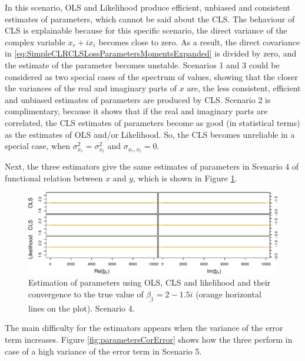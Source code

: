 \documentclass[
]{book}
\begin{document}
In this scenario, OLS and Likelihood produce efficient, unbiased and consistent estimates of parameters, which cannot be said about the CLS. The behaviour of CLS is explainable because for this specific scenario, the direct variance of the complex variable \(x_r + i x_i\) becomes close to zero. As a result, the direct covariance in \eqref{eq:SimpleCLRCLSLossParametersMomentsExpanded} is divided by zero, and the estimate of the parameter becomes unstable. Scenarios 1 and 3 could be considered as two special cases of the spectrum of values, showing that the closer the variances of the real and imaginary parts of \(x\) are, the less consistent, efficient and unbiased estimates of parameters are produced by CLS. Scenario 2 is complimentary, because it shows that if the real and imaginary parts are correlated, the CLS estimates of parameters become as good (in statistical terms) as the estimates of OLS and/or Likelihood. So, the CLS becomes unreliable in a special case, when \(\sigma_{x_r}^2 = \sigma_{x_i}^2\) and \(\sigma_{x_r,x_i}=0\).

Next, the three estimators give the same estimates of parameters in Scenario 4 of functional relation between \(x\) and \(y\), which is shown in Figure \ref{fig:parametersFR}.

\begin{figure}
\centering
\includegraphics{Svetunkov---Svetunkov---Complex-Valued-Econometrics_files/figure-latex/parametersFR-1.pdf}
\caption{\label{fig:parametersFR}Estimation of parameters using OLS, CLS and likelihood and their convergence to the true value of \(\underline{\beta_1}=2-1.5i\) (orange horizontal lines on the plot). Scenario 4.}
\end{figure}

The main difficulty for the estimators appears when the variance of the error term increases. Figure \ref{fig:parametersCorError} shows how the three perform in case of a high variance of the error term in Scenario 5.
\end{document}
